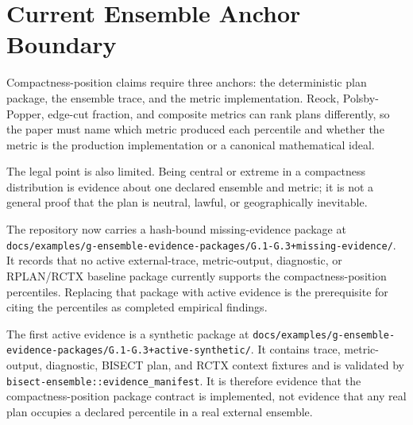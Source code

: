 \section{Current Ensemble Anchor Boundary}

Compactness-position claims require three anchors: the deterministic plan
package, the ensemble trace, and the metric implementation.  Reock, Polsby-
Popper, edge-cut fraction, and composite metrics can rank plans differently, so
the paper must name which metric produced each percentile and whether the metric
is the production implementation or a canonical mathematical ideal.

The legal point is also limited.  Being central or extreme in a compactness
distribution is evidence about one declared ensemble and metric; it is not a
general proof that the plan is neutral, lawful, or geographically inevitable.

The repository now carries a hash-bound missing-evidence package at
\texttt{docs/examples/g-ensemble-evidence-packages/G.1-G.3+missing-evidence/}.
It records that no active external-trace, metric-output, diagnostic, or
RPLAN/RCTX baseline package currently supports the compactness-position
percentiles.  Replacing that package with active evidence is the prerequisite
for citing the percentiles as completed empirical findings.

The first active evidence is a synthetic package at
\texttt{docs/examples/g-ensemble-evidence-packages/G.1-G.3+active-synthetic/}.
It contains trace, metric-output, diagnostic, BISECT plan, and RCTX context
fixtures and is validated by \texttt{bisect-ensemble::evidence\_manifest}.  It
is therefore evidence that the compactness-position package contract is
implemented, not evidence that any real plan occupies a declared percentile in a
real external ensemble.
